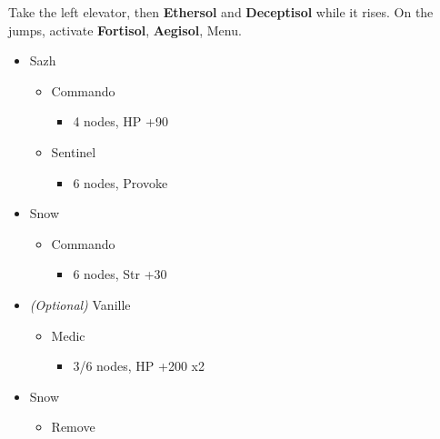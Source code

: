 \begin{multicols}{2}
  Take the left elevator, then \textbf{Ethersol} and \textbf{Deceptisol} while it rises. On the jumps, activate \textbf{Fortisol}, \textbf{Aegisol}, Menu.
  \begin{menu}
    \begin{itemize}
      \crystarium
      \begin{itemize}
        \item Sazh
              \begin{itemize}
                \item Commando
                      \begin{itemize}
                        \item 4 nodes, HP +90
                      \end{itemize}
                \item Sentinel
                      \begin{itemize}
                        \item 6 nodes, Provoke
                      \end{itemize}
              \end{itemize}
        \item Snow
              \begin{itemize}
                \item Commando
                      \begin{itemize}
                        \item 6 nodes, Str +30
                      \end{itemize}
              \end{itemize}
        \item \textit{(Optional)} Vanille
              \begin{itemize}
                \item Medic
                      \begin{itemize}
                        \item 3/6 nodes, HP +200 x2
                      \end{itemize}
              \end{itemize}
      \end{itemize}
      \equip
      \begin{itemize}
        \item Snow
              \begin{itemize}
                \item Remove
                      \begin{itemize}

\end{itemize}
\end{itemize}
\end{itemize}
\end{itemize}
\end{menu}
\end{multicols}
